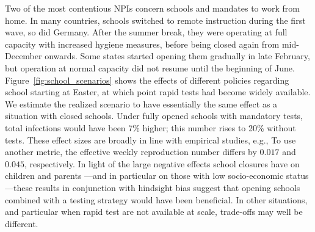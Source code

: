 Two of the most contentious NPIs concern schools and mandates to work from home. In many
countries, schools switched to remote instruction during the first wave, so did Germany.
After the summer break, they were operating at full capacity with increased hygiene
measures, before being closed again from mid-December onwards. Some states started
opening them gradually in late February, but operation at normal capacity did not resume
until the beginning of June. Figure~\ref{fig:school_scenarios} shows the effects of
different policies regarding school starting at Easter, at which point rapid tests had
become widely available. We estimate the realized scenario to have essentially the same
effect as a situation with closed schools. Under fully opened schools with mandatory
tests, total infections would have been 7\% higher; this number rises to 20\% without
tests. These effect sizes are broadly in line with empirical studies, e.g.,
\citep{Vlachos2021}
To use another metric, the effective weekly reproduction number differs by $0.017$ and
$0.045$, respectively. In light of the large negative effects school closures have on
children and parents \citep{Luijten2021, Melegari2021}---and in particular on those with
low socio-economic status---these results in conjunction with hindsight bias suggest that
opening schools combined with a testing strategy would have been beneficial. In other
situations, and particular when rapid test are not available at scale, trade-offs may
well be different.

